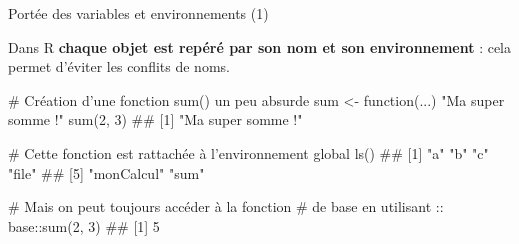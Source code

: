 \documentclass[12pt,ignorenonframetext,handout,]{beamer}
\newenvironment{Shaded}{}{}
\newcommand{\CommentTok}[1]{\textcolor[rgb]{0.00,0.50,0.00}{#1}}
\newcommand{\ControlFlowTok}[1]{\textcolor[rgb]{0.00,0.00,1.00}{#1}}
\newcommand{\DecValTok}[1]{#1}
\newcommand{\KeywordTok}[1]{\textcolor[rgb]{0.00,0.00,1.00}{#1}}
\newcommand{\NormalTok}[1]{#1}
\newcommand{\OperatorTok}[1]{#1}
\newcommand{\StringTok}[1]{\textcolor[rgb]{0.00,0.50,0.50}{#1}}
\renewenvironment{Shaded}{\begin{snugshade}}{\end{snugshade}}
\begin{document}
\begin{frame}[fragile]{\large Portée des variables et environnements
(1)}
\protect\hypertarget{portee-des-variables-et-environnements-1}{}

Dans R \textbf{chaque objet est repéré par son nom et son environnement}
: cela permet d’éviter les conflits de noms.

\pause \footnotesize

\begin{Shaded}
\begin{Highlighting}[]
\CommentTok{# Création d'une fonction sum() un peu absurde}
\NormalTok{sum <-}\StringTok{ }\ControlFlowTok{function}\NormalTok{(...) }\StringTok{"Ma super somme !"}
\KeywordTok{sum}\NormalTok{(}\DecValTok{2}\NormalTok{, }\DecValTok{3}\NormalTok{)}
\NormalTok{  ## [1] "Ma super somme !"}

\CommentTok{# Cette fonction est rattachée à l'environnement global}
\KeywordTok{ls}\NormalTok{()}
\NormalTok{  ## [1] "a"         "b"         "c"         "file"     }
\NormalTok{  ## [5] "monCalcul" "sum"}

\CommentTok{# Mais on peut toujours accéder à la fonction }
\CommentTok{# de base en utilisant ::}
\NormalTok{base}\OperatorTok{::}\KeywordTok{sum}\NormalTok{(}\DecValTok{2}\NormalTok{, }\DecValTok{3}\NormalTok{)}
\NormalTok{  ## [1] 5}
\end{Highlighting}
\end{Shaded}

\end{frame}
\end{document}
